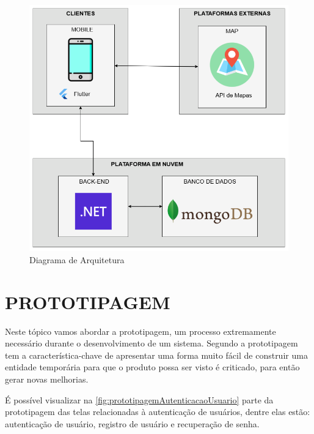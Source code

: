 \begin{figure}[H]
    \centering
    \caption{Diagrama de Arquitetura}
    \label{fig:diagramaArquiteturaDeSoftware}
    \includegraphics[scale=0.38]{./dados/figuras/diagrama-de-arquitetura.png}
\end{figure}

\section{PROTOTIPAGEM}
\label{sec:prototipagem}

Neste tópico vamos abordar a prototipagem, um processo extremamente necessário durante o desenvolvimento de um sistema. Segundo  a prototipagem tem a característica-chave de apresentar uma forma muito fácil de construir uma entidade temporária para que o produto possa ser visto é criticado, para então gerar novas melhorias.

É possível visualizar na \autoref{fig:prototipagemAutenticacaoUsuario} parte da prototipagem das telas relacionadas à autenticação de usuários, dentre elas estão: autenticação de usuário, registro de usuário e recuperação de senha.

